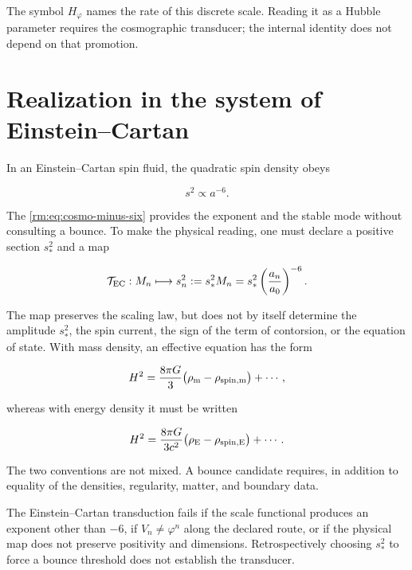 The symbol \(H_\varphi\) names the rate of this discrete scale. Reading it
as a Hubble parameter requires the cosmographic transducer; the internal
identity does not depend on that promotion.

\section{Realization in the system of Einstein--Cartan}

In an Einstein--Cartan spin fluid, the quadratic spin density
obeys

\begin{equation}
s^2\propto a^{-6}.
\label{rm:eq:cosmo-EC-scaling}
\end{equation}

The \cref{rm:eq:cosmo-minus-six} provides the exponent and the stable mode without
consulting a bounce. To make the physical reading, one must declare a
positive section \(s_*^2\) and a map

\begin{equation}
\mathcal T_{\rm EC}:M_n\longmapsto
s_n^2:=s_*^2M_n
=s_*^2\left(\frac{a_n}{a_0}\right)^{-6}.
\label{rm:eq:cosmo-EC-transducer}
\end{equation}

The map preserves the scaling law, but does not by itself determine the amplitude
\(s_*^2\), the spin current, the sign of the term of contorsion, or the
equation of state. With mass density, an effective equation has the
form

\begin{equation}
H^2=\frac{8\pi G}{3}
\bigl(\rho_{\rm m}-\rho_{\rm spin,m}\bigr)+\cdots,
\label{rm:eq:cosmo-EC-mass}
\end{equation}

whereas with energy density it must be written

\begin{equation}
H^2=\frac{8\pi G}{3c^2}
\bigl(\rho_{\rm E}-\rho_{\rm spin,E}\bigr)+\cdots.
\label{rm:eq:cosmo-EC-energy}
\end{equation}

The two conventions are not mixed. A bounce candidate requires, in addition to
equality of the densities, regularity, matter, and boundary data.

\begin{falsifier}
The Einstein--Cartan transduction fails if the scale functional produces an
exponent other than \(-6\), if \(V_n\ne\varphi^n\) along the declared route, or
if the physical map does not preserve positivity and dimensions. Retrospectively choosing
\(s_*^2\) to force a bounce threshold does not establish the
transducer.
\end{falsifier}

